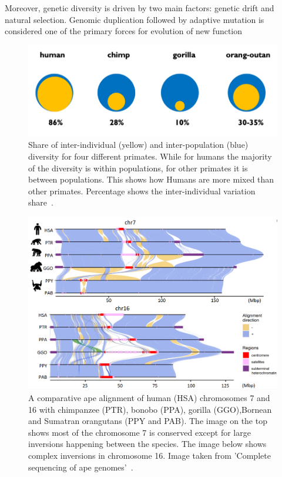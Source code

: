 Moreover, genetic diversity is driven by two main factors: genetic drift and natural selection. Genomic duplication followed by adaptive mutation is considered one of the primary forces for evolution of new function
\begin{figure}[h!]
	\centering
	\includegraphics[width=.8\linewidth]{figures/background/pop_diff.png}
	\caption[Inter-individual and inter-population variation for 4 primate species.]{Share of inter-individual (yellow) and inter-population (blue) diversity for four different primates. While for humans the  majority of the diversity is within populations, for other primates it is between populations. This shows how Humans are more mixed than other primates. Percentage shows the inter-individual variation share~\cite{genome_diversity_quintana}.}
	\label{fig:pop_diff}
\end{figure}

\begin{figure}[h!]
	\centering
	\includegraphics[width=.95\linewidth]{figures/background/genome_diff.png}
	\caption[Genomic difference in chromosome 7 and 16 of 5 primate species.]{A comparative ape alignment of human (HSA) chromosomes 7 and 16 with chimpanzee (PTR), bonobo (PPA), gorilla (GGO),Bornean and Sumatran orangutans (PPY and PAB). The image on the top shows most of the chromosome 7 is conserved except for large inversions happening between the species. The image below shows complex inversions in chromosome 16. Image taken from 'Complete sequencing of ape genomes'~\cite{ape_genomes}.}
	\label{fig:chromosome_diff}
\end{figure}

